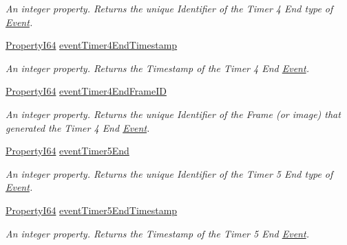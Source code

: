 \begin{DoxyCompactItemize}
\begin{DoxyCompactList}\small\item\em An integer property. Returns the unique Identifier of the Timer 4 End type of \hyperlink{classmv_i_m_p_a_c_t_1_1acquire_1_1_event}{Event}. \end{DoxyCompactList}\item 
\hyperlink{group___common_interface_ga81749b2696755513663492664a18a893}{Property\+I64} \hyperlink{classmv_i_m_p_a_c_t_1_1acquire_1_1_gen_i_cam_1_1_event_control_a6a64b1916b4a3e9d9b3d037631c465b8}{event\+Timer4\+End\+Timestamp}
\begin{DoxyCompactList}\small\item\em An integer property. Returns the Timestamp of the Timer 4 End \hyperlink{classmv_i_m_p_a_c_t_1_1acquire_1_1_event}{Event}. \end{DoxyCompactList}\item 
\hyperlink{group___common_interface_ga81749b2696755513663492664a18a893}{Property\+I64} \hyperlink{classmv_i_m_p_a_c_t_1_1acquire_1_1_gen_i_cam_1_1_event_control_a48b591168a671b1064025585638a5366}{event\+Timer4\+End\+Frame\+I\+D}
\begin{DoxyCompactList}\small\item\em An integer property. Returns the unique Identifier of the Frame (or image) that generated the Timer 4 End \hyperlink{classmv_i_m_p_a_c_t_1_1acquire_1_1_event}{Event}. \end{DoxyCompactList}\item 
\hyperlink{group___common_interface_ga81749b2696755513663492664a18a893}{Property\+I64} \hyperlink{classmv_i_m_p_a_c_t_1_1acquire_1_1_gen_i_cam_1_1_event_control_a627d5f913d207f6aa64a3f55188d6a7d}{event\+Timer5\+End}
\begin{DoxyCompactList}\small\item\em An integer property. Returns the unique Identifier of the Timer 5 End type of \hyperlink{classmv_i_m_p_a_c_t_1_1acquire_1_1_event}{Event}. \end{DoxyCompactList}\item 
\hyperlink{group___common_interface_ga81749b2696755513663492664a18a893}{Property\+I64} \hyperlink{classmv_i_m_p_a_c_t_1_1acquire_1_1_gen_i_cam_1_1_event_control_a9f312bba0140be0288f73c1605981269}{event\+Timer5\+End\+Timestamp}
\begin{DoxyCompactList}\small\item\em An integer property. Returns the Timestamp of the Timer 5 End \hyperlink{classmv_i_m_p_a_c_t_1_1acquire_1_1_event}{Event}. \end{DoxyCompactList}\item 

\end{DoxyCompactItemize}
